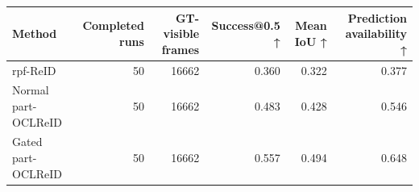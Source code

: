 \begin{tabular}{lrrrrr}
\toprule
             Method &  Completed runs &  GT-visible frames &  Success@0.5 ↑ &  Mean IoU ↑ &  Prediction availability ↑ \\
\midrule
           rpf-ReID &              50 &              16662 &          0.360 &       0.322 &                      0.377 \\
Normal part-OCLReID &              50 &              16662 &          0.483 &       0.428 &                      0.546 \\
 Gated part-OCLReID &              50 &              16662 &          0.557 &       0.494 &                      0.648 \\
\bottomrule
\end{tabular}
